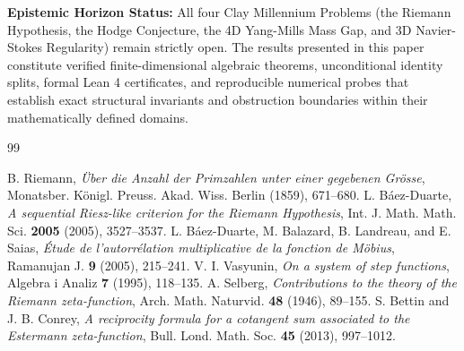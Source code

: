 \documentclass[11pt,a4paper]{article}
\theoremstyle{definition}
\begin{document}
\vspace{0.5em}
\noindent\textbf{Epistemic Horizon Status:} All four Clay Millennium Problems (the Riemann Hypothesis, the Hodge Conjecture, the 4D Yang-Mills Mass Gap, and 3D Navier-Stokes Regularity) remain strictly open. The results presented in this paper constitute verified finite-dimensional algebraic theorems, unconditional identity splits, formal Lean 4 certificates, and reproducible numerical probes that establish exact structural invariants and obstruction boundaries within their mathematically defined domains.

\begin{thebibliography}{99}

 B. Riemann, \emph{\"Uber die Anzahl der Primzahlen unter einer gegebenen Gr\"osse}, Monatsber. K\"onigl. Preuss. Akad. Wiss. Berlin (1859), 671--680.
 L. B\'aez-Duarte, \emph{A sequential Riesz-like criterion for the Riemann Hypothesis}, Int. J. Math. Math. Sci. \textbf{2005} (2005), 3527--3537.
 L. B\'aez-Duarte, M. Balazard, B. Landreau, and E. Saias, \emph{\'Etude de l'autorr\'elation multiplicative de la fonction de M\"obius}, Ramanujan J. \textbf{9} (2005), 215--241.
 V. I. Vasyunin, \emph{On a system of step functions}, Algebra i Analiz \textbf{7} (1995), 118--135.
 A. Selberg, \emph{Contributions to the theory of the Riemann zeta-function}, Arch. Math. Naturvid. \textbf{48} (1946), 89--155.
 S. Bettin and J. B. Conrey, \emph{A reciprocity formula for a cotangent sum associated to the Estermann zeta-function}, Bull. Lond. Math. Soc. \textbf{45} (2013), 997--1012.

\end{thebibliography}
\end{document}
